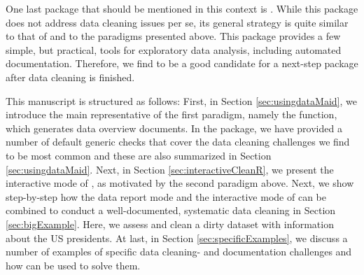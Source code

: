 \documentclass[article,shortnames]{jss}
\begin{document}

One last package that should be mentioned in this context is
 \citep{DataExplorer}. While this package does not
address data cleaning issues per se, its general strategy is
quite similar to that of  and to the paradigms presented
above. This package provides a few simple, but practical, tools for
exploratory data analysis, including automated
documentation. Therefore, we find  to be a good
candidate for a next-step package after data cleaning is finished.



This manuscript is structured as follows: First, in Section
\ref{sec:usingdataMaid}, we introduce the main representative of the first
paradigm, namely the  function, which generates data
overview documents. In the  package, we have
provided a number of default generic checks that cover the data
cleaning challenges we find to be most common and these are also summarized in Section \ref{sec:usingdataMaid}. Next, in Section
\ref{sec:interactiveCleanR}, we present the interactive mode of , as motivated
by the second paradigm above. Next, we show step-by-step how the data report mode and the interactive mode of  can be combined to conduct a well-documented, systematic data cleaning in Section \ref{sec:bigExample}. Here, we assess and clean a dirty dataset with information about the US presidents.  At last, in Section \ref{sec:specificExamples}, we discuss a number of examples of
specific data cleaning- and documentation challenges and how  can be used to
solve them. 
\end{document}
